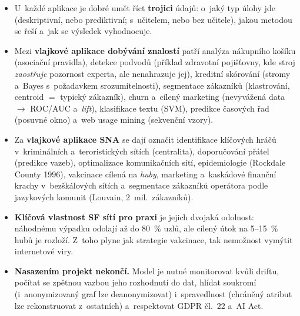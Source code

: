 \documentclass[11pt,a4paper]{article}
\theoremstyle{definition}
\begin{document}
\begin{itemize}
\item U~každé aplikace je dobré umět říct \textbf{trojici} údajů: o~jaký typ úlohy jde
      (deskriptivní, nebo prediktivní; s~učitelem, nebo bez učitele), jakou metodou se řeší
      a~jak se výsledek vyhodnocuje.
\item Mezi \textbf{vlajkové aplikace dobývání znalostí} patří analýza nákupního košíku
      (asociační pravidla), detekce podvodů (příklad zdravotní pojišťovny, kde stroj
      \emph{zaostřuje} pozornost experta, ale nenahrazuje jej), kreditní skórování (stromy
      a~Bayes s~požadavkem srozumitelnosti), segmentace zákazníků (klastrování, centroid $=$
      typický zákazník), churn a~cílený marketing (nevyvážená data $\to$ ROC/AUC a~\emph{lift}),
      klasifikace textu (SVM), predikce časových řad (posuvné okno) a~web usage mining
      (sekvenční vzory).
\item Za \textbf{vlajkové aplikace SNA} se dají označit identifikace klíčových hráčů
      v~kriminálních a~teroristických sítích (centralita), doporučování přátel (predikce vazeb),
      optimalizace komunikačních sítí, epidemiologie (Rockdale County 1996), vakcinace cílená na
      \emph{huby}, marketing a~kaskádové finanční krachy v~bezškálových sítích a~segmentace
      zákazníků operátora podle jazykových komunit (Louvain, 2~mil.\ zákazníků).
\item \textbf{Klíčová vlastnost SF sítí pro praxi} je jejich dvojaká odolnost: náhodnému výpadku
      odolají až do 80~\% uzlů, ale cílený útok na 5--15~\% hubů je rozloží. Z~toho plyne jak
      strategie vakcinace, tak nemožnost vymýtit internetové viry.
\item \textbf{Nasazením projekt nekončí.} Model je nutné monitorovat kvůli driftu, počítat se
      zpětnou vazbou jeho rozhodnutí do dat, hlídat soukromí (i~anonymizovaný graf lze
      deanonymizovat) i~spravedlnost (chráněný atribut lze rekonstruovat z~ostatních)
      a~respektovat GDPR čl.~22 a~AI Act.
\end{itemize}
\end{document}
